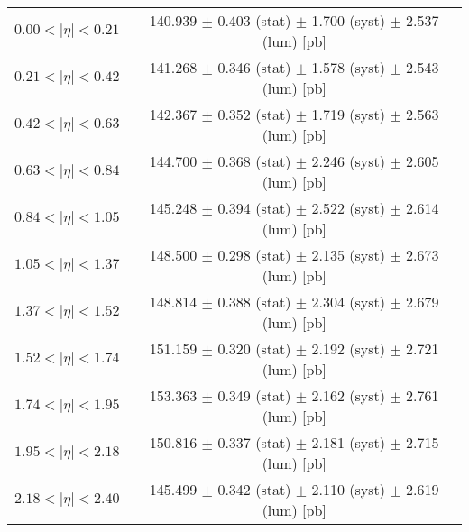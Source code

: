 \begin{tabular}{lc}
\hline
$0.00 < |\eta| <0.21$          & 140.939 $\pm$ 0.403 (stat) $\pm$ 1.700 (syst) $\pm$ 2.537 (lum) [pb]  \\
$0.21 < |\eta| <0.42$          & 141.268 $\pm$ 0.346 (stat) $\pm$ 1.578 (syst) $\pm$ 2.543 (lum) [pb]  \\
$0.42 < |\eta| <0.63$          & 142.367 $\pm$ 0.352 (stat) $\pm$ 1.719 (syst) $\pm$ 2.563 (lum) [pb]  \\
$0.63 < |\eta| <0.84$          & 144.700 $\pm$ 0.368 (stat) $\pm$ 2.246 (syst) $\pm$ 2.605 (lum) [pb]  \\
$0.84 < |\eta| <1.05$          & 145.248 $\pm$ 0.394 (stat) $\pm$ 2.522 (syst) $\pm$ 2.614 (lum) [pb]  \\
$1.05 < |\eta| <1.37$          & 148.500 $\pm$ 0.298 (stat) $\pm$ 2.135 (syst) $\pm$ 2.673 (lum) [pb]  \\
$1.37 < |\eta| <1.52$          & 148.814 $\pm$ 0.388 (stat) $\pm$ 2.304 (syst) $\pm$ 2.679 (lum) [pb]  \\
$1.52 < |\eta| <1.74$          & 151.159 $\pm$ 0.320 (stat) $\pm$ 2.192 (syst) $\pm$ 2.721 (lum) [pb]  \\
$1.74 < |\eta| <1.95$          & 153.363 $\pm$ 0.349 (stat) $\pm$ 2.162 (syst) $\pm$ 2.761 (lum) [pb]  \\
$1.95 < |\eta| <2.18$          & 150.816 $\pm$ 0.337 (stat) $\pm$ 2.181 (syst) $\pm$ 2.715 (lum) [pb]  \\
$2.18 < |\eta| <2.40$          & 145.499 $\pm$ 0.342 (stat) $\pm$ 2.110 (syst) $\pm$ 2.619 (lum) [pb]  \\
\hline
\end{tabular}
